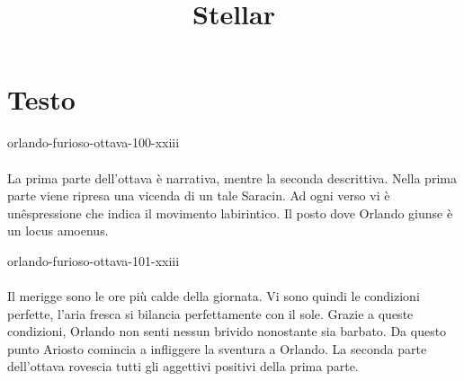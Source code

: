 \documentclass[preview]{standalone}
\begin{document}
\title{Stellar}
\genpage

\section{Testo}

\begin{snippet}{orlando-furioso-ottava-100-xxiii}
    \\\\
    La prima parte dell'ottava è narrativa, mentre la seconda descrittiva.
    Nella prima parte viene ripresa una vicenda di un tale Saracin.
    Ad ogni verso vi è unêspressione che indica il movimento labirintico.
    Il posto dove Orlando giunse è un locus amoenus.
\end{snippet}

\begin{snippet}{orlando-furioso-ottava-101-xxiii}
    \\\\
    Il merigge sono le ore più calde della giornata.
    Vi sono quindi le condizioni perfette, l'aria fresca si bilancia perfettamente con il sole.
    Grazie a queste condizioni, Orlando non senti nessun brivido nonostante sia barbato.
    Da questo punto Ariosto comincia a infliggere la sventura a Orlando.
    La seconda parte dell'ottava rovescia tutti gli aggettivi positivi della prima parte.
\end{snippet}
\end{document}
